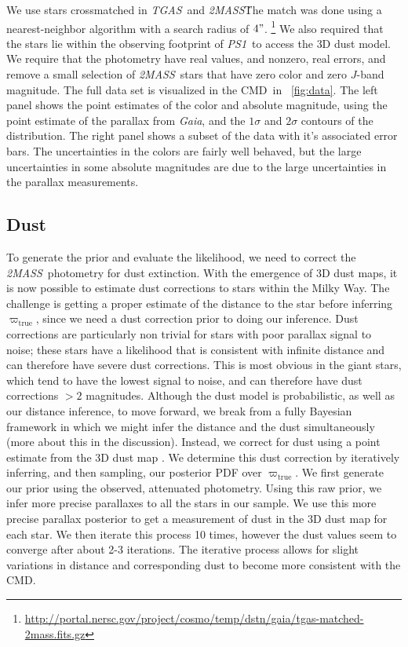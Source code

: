 \documentclass[modern]{aastex61}
\newcommand{\acronym}[1]{{\small{#1}}}
\newcommand{\project}[1]{\textsl{#1}}
\newcommand{\tgas}{\project{\acronym{TGAS}}}
\newcommand{\tmass}{\project{\acronym{2MASS}}}
\newcommand{\psone}{\project{\acronym{PS1}}}
\newcommand{\gaia}{\project{Gaia}}
\newcommand{\cmd}{\acronym{CMD}}
\newcommand{\true}{\mathrm{true}}
\begin{document}
We use stars crossmatched in \tgas\ and \tmass\.
The match was done using a nearest-neighbor algorithm with a search radius of $4"$.
\footnote{\url{http://portal.nersc.gov/project/cosmo/temp/dstn/gaia/tgas-matched-2mass.fits.gz}}
We also required that the stars lie within the
observing footprint of \psone\ to access the \cite{green15} 3D dust model.
We require that the photometry have real values, and nonzero, real errors, and
remove a small selection of \tmass\ stars that have zero color and zero $J$-band
magnitude.
The full data set is visualized in the \cmd\ in \figurename~\ref{fig:data}.
The left panel shows the point estimates of the color and absolute magnitude,
using the point estimate of the parallax from \gaia, and the $1\sigma$ and
$2\sigma$ contours of the distribution.
The right panel shows a subset of the data with it's associated error bars.
The uncertainties in the colors are fairly well behaved, but the large
uncertainties in some absolute magnitudes are due to the large uncertainties in
the parallax measurements.

\subsection{Dust}

To generate the prior and evaluate the likelihood, we need to
correct the \tmass\ photometry for dust extinction.
With the emergence of 3D dust maps, it is now possible to estimate dust
corrections to stars within the Milky Way. The challenge is getting a
proper estimate of the distance to the star before inferring
$\varpi_{\true}$, since we need a dust correction prior to doing our
inference. Dust corrections are particularly non trivial for stars
with poor parallax signal to noise; these stars have
a likelihood that is consistent with infinite distance and can
therefore have severe dust corrections. This is most obvious in the
giant stars, which tend to have the lowest signal to noise, and can
therefore have dust corrections $> 2$ magnitudes. Although the dust
model is probabilistic, as well as our distance inference, to move
forward, we break from a fully Bayesian framework in which we might
infer the distance and the dust simultaneously (more about this in the
discussion). Instead, we correct for dust using a point estimate from
the 3D dust map \citep{green15}. We determine this dust correction by
iteratively inferring, and then sampling, our posterior PDF over
$\varpi_{\true}$. We first generate our prior using the observed,
attenuated photometry. Using this raw prior, we infer more precise
parallaxes to all the stars in our sample. We use this more
precise parallax posterior to get a measurement of dust in the 3D dust
map for each star. We then iterate this process 10 times, however
the dust values seem to converge after about 2-3 iterations. The
iterative process allows for slight variations in distance and
corresponding dust to become more consistent with the \cmd.
\end{document}
